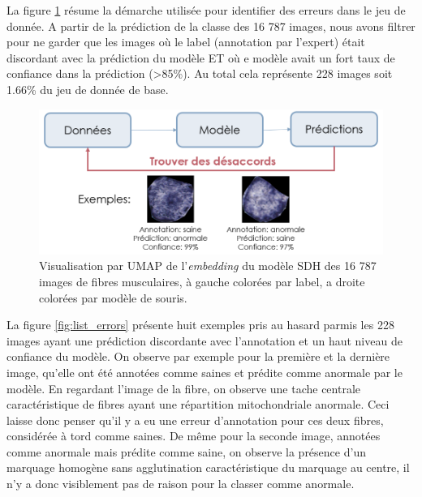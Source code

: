 La figure \ref{fig:identify_errors} résume la démarche utilisée pour identifier des erreurs dans le jeu de donnée. A partir de la prédiction de la classe des 16 787 images, nous avons filtrer pour ne garder que les images où le label (annotation par l'expert) était discordant avec la prédiction du modèle ET où e modèle avait un fort taux de confiance dans la prédiction (>85\%). Au total cela représente 228 images soit 1.66\% du jeu de donnée de base.
\begin{figure}[htbp]
 \centering
 \includegraphics[width=1\textwidth]{figures/identify_errors.png}
 \caption[Visualisation par UMAP de l'\textit{embedding} du modèle SDH]{Visualisation par UMAP de l'\textit{embedding} du modèle SDH des 16 787 images de fibres musculaires, à gauche colorées par label, a droite colorées par modèle de souris.}
 \label{fig:identify_errors}
\end{figure}

La figure \ref{fig:list_errors} présente huit exemples pris au hasard parmis les 228 images ayant une prédiction discordante avec l'annotation et un haut niveau de confiance du modèle. On observe par exemple pour la première et la dernière image, qu'elle ont été annotées comme saines et prédite comme anormale par le modèle. En regardant l'image de la fibre, on observe une tache centrale caractéristique de fibres ayant une répartition mitochondriale anormale. Ceci laisse donc penser qu'il y a eu une erreur d'annotation pour ces deux fibres, considérée à tord comme saines. De même pour la seconde image, annotées comme anormale mais prédite comme saine, on observe la présence d'un marquage homogène sans agglutination caractéristique du marquage au centre, il n'y a donc visiblement pas de raison pour la classer comme anormale.

